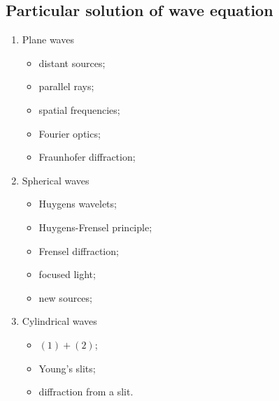 \documentclass[10pt]{article}
\begin{document}
\subsection{Particular solution of wave equation}
\begin{enumerate}
\item Plane waves
\begin{itemize}
\item[$\to$] distant sources;
\item[$\to$] parallel rays;
\item[$\to$] spatial frequencies;
\item[$\to$] Fourier optics;
\item[$\to$] Fraunhofer diffraction;
\end{itemize}
\item Spherical waves
\begin{itemize}
\item[$\to$] Huygens wavelets;
\item[$\to$] Huygens-Frensel principle;
\item[$\to$] Frensel diffraction;
\item[$\to$] focused light;
\item[$\to$] new sources;
\end{itemize}
\item Cylindrical waves
\begin{itemize}
\item[$\to$] $(1) + (2)$;
\item[$\to$] Young's slits;
\item[$\to$] diffraction from a slit.
\end{itemize}
\end{enumerate}
\end{document}
